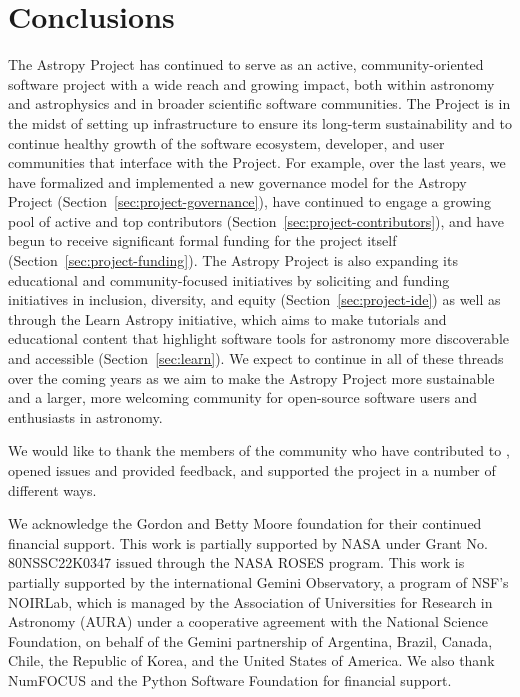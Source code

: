 \documentclass[modern]{aastex631}
\begin{document}
\section{Conclusions}
\label{sec:conclusions}

The Astropy Project has continued to serve as an active, community-oriented
software project with a wide reach and growing impact, both within astronomy and
astrophysics and in broader scientific software communities.
The Project is in the midst of setting up infrastructure to ensure its long-term
sustainability and to continue healthy growth of the software ecosystem,
developer, and user communities that interface with the Project.
For example, over the last years, we have formalized and implemented a new
governance model for the Astropy Project (Section~\ref{sec:project-governance}),
have continued to engage a growing pool of active and top contributors
(Section~\ref{sec:project-contributors}), and have begun to receive significant
formal funding for the project itself (Section~\ref{sec:project-funding}).
The Astropy Project is also expanding its educational and community-focused
initiatives by soliciting and funding initiatives in inclusion, diversity, and
equity (Section~\ref{sec:project-ide}) as well as through the Learn Astropy initiative,
which aims to make tutorials and educational content that highlight software
tools for astronomy more discoverable and accessible (Section~\ref{sec:learn}).
We expect to continue in all of these threads over the coming years as we aim to
make the Astropy Project more sustainable and a larger, more welcoming community
for open-source software users and enthusiasts in astronomy.


\vspace{2em}

We would like to thank the members of the community who have contributed to
\astropy, opened issues and provided feedback, and supported the
project in a number of different ways.

We acknowledge the Gordon and Betty Moore foundation for their continued
financial support.
This work is partially supported by NASA under Grant No. 80NSSC22K0347 issued
through the NASA ROSES program.
This work is partially supported by the international Gemini Observatory, a
program of NSF's NOIRLab, which is managed by the Association of Universities
for Research in Astronomy (AURA) under a cooperative agreement with the National
Science Foundation, on behalf of the Gemini partnership of Argentina, Brazil,
Canada, Chile, the Republic of Korea, and the United States of America.
We also thank NumFOCUS and the Python Software Foundation for financial
support.
\end{document}
